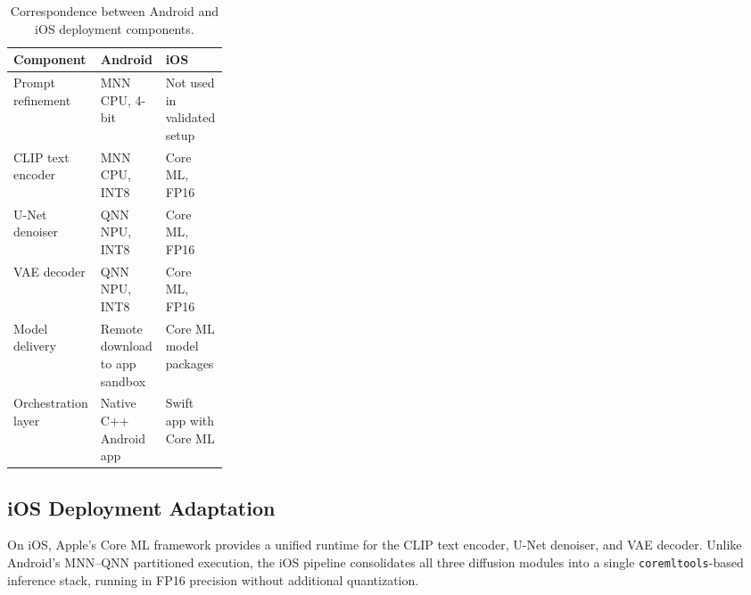 \begin{table}[t]
    \centering
    \caption{Correspondence between Android and iOS deployment components.}
    \label{tab:correspondence_android_ios}
    \footnotesize
    \setlength{\tabcolsep}{4pt}
    \renewcommand{\arraystretch}{1.12}

    \begin{tabularx}{0.96\linewidth}{
        @{}
        >{\raggedright\arraybackslash}p{0.28\linewidth}
        >{\raggedright\arraybackslash}X
        >{\raggedright\arraybackslash}X
        @{}
    }
        \toprule
        \textbf{Component} & \textbf{Android} & \textbf{iOS} \\
        \midrule
        Prompt refinement & MNN CPU, 4-bit & Not used in validated setup \\
        CLIP text encoder & MNN CPU, INT8 & Core ML, FP16 \\
        U-Net denoiser & QNN NPU, INT8 & Core ML, FP16 \\
        VAE decoder & QNN NPU, INT8 & Core ML, FP16 \\
        Model delivery & Remote download to app sandbox & Core ML model packages \\
        Orchestration layer & Native C++ Android app & Swift app with Core ML \\
        \bottomrule
    \end{tabularx}

    \renewcommand{\arraystretch}{1.0}
    \setlength{\tabcolsep}{6pt}
\end{table}

\subsection{iOS Deployment Adaptation}

On iOS, Apple's Core ML framework provides a unified runtime for the CLIP text encoder, U-Net denoiser, and VAE decoder. Unlike Android's MNN--QNN partitioned execution, the iOS pipeline consolidates all three diffusion modules into a single \texttt{coremltools}-based inference stack, running in FP16 precision without additional quantization.

